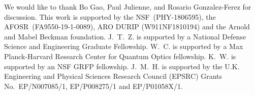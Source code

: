 \documentclass[aps,prl,twocolumn,10pt,superscriptaddress]{revtex4-1}
\begin{document}
\begin{acknowledgments}
  We would like to thank Bo Gao,  Paul Julienne, and Rosario Gonzalez-Ferez for discussion. This work is supported by the NSF~(PHY-1806595), the AFOSR~(FA9550-19-1-0089), ARO DURIP (W911NF1810194) and the Arnold and Mabel Beckman foundation. J.~T.~Z. is supported by a National Defense Science and Engineering Graduate Fellowship. W.~C. is supported by a Max Planck-Harvard Research Center for Quantum Optics fellowship. K.~W. is supported by an NSF GRFP fellowship. J.~M.~H. is supported by the U.K. Engineering and Physical Sciences Research Council (EPSRC) Grants No.\ EP/N007085/1, EP/P008275/1 and EP/P01058X/1.
\end{acknowledgments}



\end{document}
